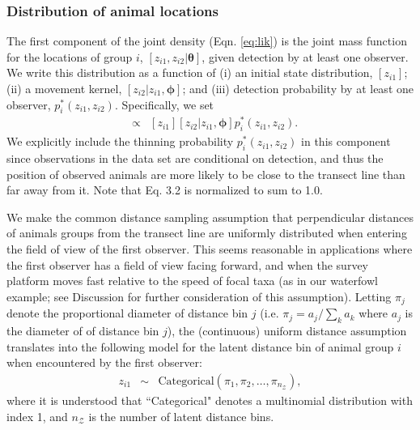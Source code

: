 \documentclass[aoas,preprint]{imsart}
\numberwithin{equation}{section}
\theoremstyle{plain}
\begin{document}
\subsubsection{Distribution of animal locations}

The first component of the joint density (Eqn. \ref{eq:lik}) is the joint mass function for the locations of group $i$, $[z_{i1},z_{i2}|\boldsymbol{\theta}]$, given detection by at least one observer.  We write this distribution as a function of (i) an initial state distribution, $[z_{i1}]$; (ii) a movement kernel, $[z_{i2}|z_{i1},\boldsymbol{\phi}]$; and (iii) detection probability by at least one observer, $p_i^*(z_{i1},z_{i2})$.  Specifically, we set
\begin{eqnarray}
[z_{i 1},z_{i 2} |\boldsymbol{\theta}] & \propto & [z_{i1}][z_{i2}|z_{i1},\boldsymbol{\phi}]p_i^*(z_{i1},z_{i2}).
\label{eq:z}
\end{eqnarray}
We explicitly include the thinning probability $p_i^*(z_{i1},z_{i2})$ in this component since observations in the data set are conditional on detection, and thus the position of observed animals are more likely to be close to the transect line than far away from it. Note that Eq. 3.2 is normalized to sum to 1.0.

We make the common distance sampling assumption \citep[cf.][]{BucklandEtAl2001} that perpendicular distances of animals groups from the transect line are uniformly distributed when entering the field of view of the first observer.  This seems reasonable in applications where the first observer has a field of view facing forward, and when the survey platform moves fast relative to the speed of focal taxa (as in our waterfowl example; see Discussion for further consideration of this assumption). Letting $\pi_j$ denote the proportional diameter of distance bin $j$ (i.e. $\pi_j = a_j / \sum_k a_k$ where $a_j$ is the diameter of of distance bin $j$), the (continuous) uniform distance assumption translates into the following model for the latent distance bin of animal group $i$ when encountered by the first observer:
\begin{eqnarray*}
  z_{i1} & \sim & \text{Categorical}(\pi_1,\pi_2,\hdots,\pi_{n_{\mathcal{Z}}}),
\end{eqnarray*}
where it is understood that ``Categorical" denotes a multinomial distribution with index 1, and $n_{\mathcal{Z}}$ is the number of latent distance bins.
\end{document}
